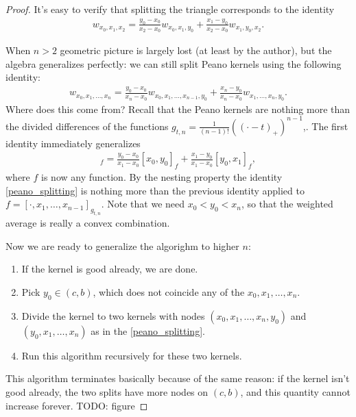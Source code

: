 \begin{proof}
	It's easy to verify that splitting the triangle corresponds to the identity
	\begin{align*}
		w_{x_{0}, x_{1}, x_{2}} = \frac{y_{0} - x_{0}}{x_{2} - x_{0}} w_{x_{0}, x_{1}, y_{0}} + \frac{x_{1} - y_{0}}{x_{2} - x_{0}} w_{x_{1}, y_{0}, x_{2}}.
	\end{align*}

	When $n > 2$ geometric picture is largely lost (at least by the author), but the algebra generalizes perfectly: we can still split Peano kernels using the following identity:
	\begin{align}\label{peano_splitting}
		w_{x_{0}, x_{1}, \ldots, x_{n}} = \frac{y_{0} - x_{0}}{x_{n} - x_{0}} w_{x_{0}, x_{1}, \ldots, x_{n - 1}, y_{0}} + \frac{x_{n} - y_{0}}{x_{n} - x_{0}} w_{x_{1}, \ldots, x_{n}, y_{0}}.
	\end{align}
	Where does this come from? Recall that the Peano kernels are nothing more than the divided differences of the functions $g_{t, n} = \frac{1}{(n - 1)!}((\cdot - t)_{+})^{n - 1}$,. The first identity immediately generalizes
	\begin{align*}
		[x_{0}, x_{1}]_{f} = \frac{y_{0} - x_{0}}{x_{1} - x_{0}} [x_{0}, y_{0}]_{f} + \frac{x_{1} - y_{0}}{x_{1} - x_{0}} [y_{0}, x_{1}]_{f},
	\end{align*}
	where $f$ is now any function. By the nesting property the identity \ref{peano_splitting} is nothing more than the previous identity applied to $f = [\cdot, x_{1}, \ldots, x_{n - 1}]_{g_{t, n}}$. Note that we need $x_{0} < y_{0} < x_{n}$, so that the weighted average is really a convex combination.

	Now we are ready to generalize the algorighm to higher $n$:
	\begin{enumerate}
		\item If the kernel is good already, we are done.
		\item Pick $y_{0} \in (c, b)$, which does not coincide any of the $x_{0}, x_{1}, \ldots, x_{n}$.
		\item Divide the kernel to two kernels with nodes $(x_{0}, x_{1}, \ldots, x_{n}, y_{0})$ and $(y_{0}, x_{1}, \ldots, x_{n})$ as in the \ref{peano_splitting}.
		\item Run this algorithm recursively for these two kernels.
	\end{enumerate}
	This algorithm terminates basically because of the same reason: if the kernel isn't good already, the two splits have more nodes on $(c, b)$, and this quantity cannot increase forever.
	TODO: figure
\end{proof}

